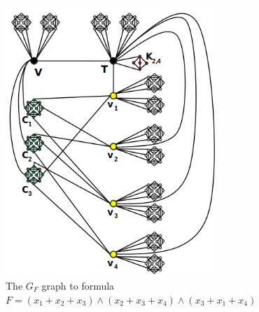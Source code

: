 \begin{figure}[htb]	
\center%
\includegraphics[width=8cm]{./img/exemploGrafoGFSBPO4.png}
\caption{The $G_{F}$ graph to formula $F=(x_1+ x_2+ x_3) \wedge  (x_2+ x_3+ x_4 )\wedge  (x_3 + x_1 + x_4 )$}
\label{fig:exemploGrafoGF}
\end{figure}